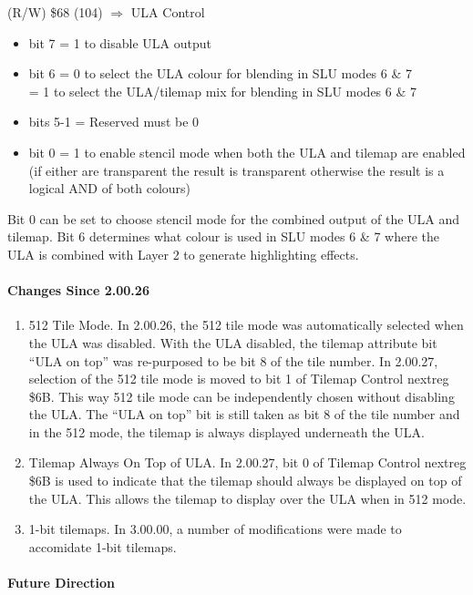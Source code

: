 (R/W) \$68 (104) $\Rightarrow$ ULA Control
\begin{itemize}
\item[] bit 7    = 1 to disable ULA output
\item[] bit 6 = 0 to select the ULA colour for blending in SLU modes 6
  \& 7\\
  = 1 to select the ULA/tilemap mix for blending in SLU modes 6 \& 7
\item[] bits 5-1 = Reserved must be 0
\item[] bit 0 = 1 to enable stencil mode when both the ULA and tilemap
  are enabled\\
  (if either are transparent the result is transparent otherwise the
  result is a logical AND of both colours)
\end{itemize}

Bit 0 can be set to choose stencil mode for the combined output of the
ULA and tilemap. Bit 6 determines what colour is used in SLU modes 6 \&
7 where the ULA is combined with Layer 2 to generate highlighting
effects.

\paragraph{Changes Since 2.00.26}

\begin{enumerate}
\item 512 Tile Mode. In 2.00.26, the 512 tile mode was automatically
  selected when the ULA was disabled. With the ULA disabled, the
  tilemap attribute bit “ULA on top” was re-purposed to be bit 8 of
  the tile number. In 2.00.27, selection of the 512 tile mode is moved
  to bit 1 of Tilemap Control nextreg \$6B. This way 512 tile mode can
  be independently chosen without disabling the ULA. The “ULA on top”
  bit is still taken as bit 8 of the tile number and in the 512 mode,
  the tilemap is always displayed underneath the ULA.
\item Tilemap Always On Top of ULA. In 2.00.27, bit 0 of Tilemap
  Control nextreg \$6B is used to indicate that the tilemap should
  always be displayed on top of the ULA. This allows the tilemap to
  display over the ULA when in 512 mode.
\item 1-bit tilemaps. In 3.00.00, a number of modifications were made
  to accomidate 1-bit tilemaps.
\end{enumerate}

\paragraph{Future Direction}

